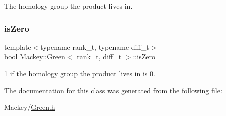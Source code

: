 The homology group the product lives in. 

\mbox{\label{classMackey_1_1Green_a12a01a6d1715538af0bdc6b34fad6b85}} 
\subsubsection{\texorpdfstring{is\+Zero}{isZero}}
{\footnotesize\ttfamily template$<$typename rank\+\_\+t, typename diff\+\_\+t$>$ \\
bool \hyperlink{classMackey_1_1Green}{Mackey\+::\+Green}$<$ rank\+\_\+t, diff\+\_\+t $>$\+::is\+Zero}



1 if the homology group the product lives in is 0. 



The documentation for this class was generated from the following file\+:\begin{DoxyCompactItemize}
\item 
Mackey/\hyperlink{Green_8h}{Green.\+h}\end{DoxyCompactItemize}
